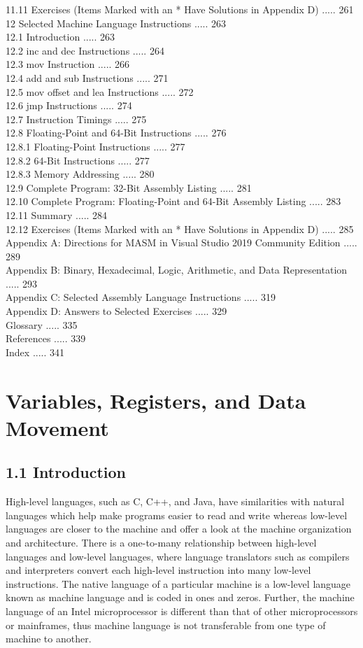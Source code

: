 \documentclass[10pt]{article}
\begin{document}
11.11 Exercises (Items Marked with an * Have Solutions in Appendix D) ..... 261\\
12 Selected Machine Language Instructions ..... 263\\
12.1 Introduction ..... 263\\
12.2 inc and dec Instructions ..... 264\\
12.3 mov Instruction ..... 266\\
12.4 add and sub Instructions ..... 271\\
12.5 mov offset and lea Instructions ..... 272\\
12.6 jmp Instructions ..... 274\\
12.7 Instruction Timings ..... 275\\
12.8 Floating-Point and 64-Bit Instructions ..... 276\\
12.8.1 Floating-Point Instructions ..... 277\\
12.8.2 64-Bit Instructions ..... 277\\
12.8.3 Memory Addressing ..... 280\\
12.9 Complete Program: 32-Bit Assembly Listing ..... 281\\
12.10 Complete Program: Floating-Point and 64-Bit Assembly Listing ..... 283\\
12.11 Summary ..... 284\\
12.12 Exercises (Items Marked with an * Have Solutions in Appendix D) ..... 285\\
Appendix A: Directions for MASM in Visual Studio 2019 Community Edition ..... 289\\
Appendix B: Binary, Hexadecimal, Logic, Arithmetic, and Data Representation ..... 293\\
Appendix C: Selected Assembly Language Instructions ..... 319\\
Appendix D: Answers to Selected Exercises ..... 329\\
Glossary ..... 335\\
References ..... 339\\
Index ..... 341

\section*{Variables, Registers, and Data Movement}
\subsection*{1.1 Introduction}
High-level languages, such as C, C++, and Java, have similarities with natural languages which help make programs easier to read and write whereas low-level languages are closer to the machine and offer a look at the machine organization and architecture. There is a one-to-many relationship between high-level languages and low-level languages, where language translators such as compilers and interpreters convert each high-level instruction into many low-level instructions. The native language of a particular machine is a low-level language known as machine language and is coded in ones and zeros. Further, the machine language of an Intel microprocessor is different than that of other microprocessors or mainframes, thus machine language is not transferable from one type of machine to another.
\end{document}
